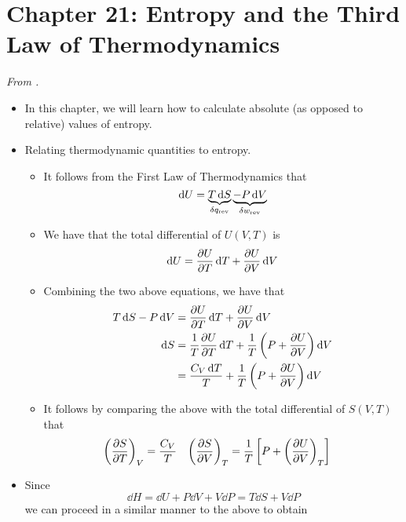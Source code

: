 \documentclass[../notes.tex]{subfiles}
\begin{document}
\section{Chapter 21: Entropy and the Third Law of Thermodynamics}
\emph{From \textcite{bib:McQuarrieSimon}.}
\begin{itemize}
    \item In this chapter, we will learn how to calculate absolute (as opposed to relative) values of entropy.
    \item Relating thermodynamic quantities to entropy.
    \begin{itemize}
        \item It follows from the First Law of Thermodynamics that
        \begin{equation*}
            \dd{U} = \underbrace{T\dd{S}}_{\var{q_\text{rev}}}\underbrace{-P\dd{V}}_{\var{w_\text{rev}}}
        \end{equation*}
        \item We have that the total differential of $U(V,T)$ is
        \begin{equation*}
            \dd{U} = \pdv{U}{T}\dd{T}+\pdv{U}{V}\dd{V}
        \end{equation*}
        \item Combining the two above equations, we have that
        \begin{align*}
            T\dd{S}-P\dd{V} &= \pdv{U}{T}\dd{T}+\pdv{U}{V}\dd{V}\\
            \dd{S} &= \frac{1}{T}\pdv{U}{T}\dd{T}+\frac{1}{T}\left( P+\pdv{U}{V} \right)\dd{V}\\
            &= \frac{C_V\dd{T}}{T}+\frac{1}{T}\left( P+\pdv{U}{V} \right)\dd{V}
        \end{align*}
        \item It follows by comparing the above with the total differential of $S(V,T)$ that
        \begin{align*}
            \left( \pdv{S}{T} \right)_V &= \frac{C_V}{T}&
            \left( \pdv{S}{V} \right)_T &= \frac{1}{T}\left[ P+\left( \pdv{U}{V} \right)_T \right]
        \end{align*}
    \end{itemize}
    \item Since
    \begin{equation*}
        \dd{H} = \dd{U}+P\dd{V}+V\dd{P}
        = T\dd{S}+V\dd{P}
    \end{equation*}
    we can proceed in a similar manner to the above to obtain
    \begin{align*}

\end{align*}
\end{itemize}
\end{document}

